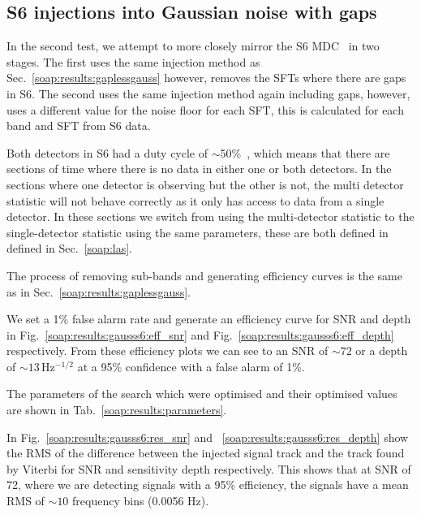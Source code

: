 \subsection{\label{soap:results:gausss6} S6 injections into Gaussian noise with gaps}

%
%
In the second test, we attempt to more closely mirror the S6 \gls{MDC}~\citep{walsh2016ComparisonMethods} in two stages. The first uses the same injection method as Sec.~\ref{soap:results:gaplessgauss} however, removes the \glspl{SFT} where there are gaps in S6. 
The second uses the same injection method again including gaps, however, uses a different value for the noise floor for each \gls{SFT}, this is calculated for each band and \gls{SFT} from S6 data.

Both detectors in S6 had a duty cycle of $\sim$50\%~\citep{aasi2015CharacterizationLIGO}, which means that there are sections of time where there is no data in either one or both detectors. In the sections where one detector is observing but the other is not, the multi detector statistic will not behave correctly as it only has access to data from a single detector.
In these sections we switch from using the multi-detector statistic to the single-detector statistic using the same parameters, these are both defined in defined in Sec.~\ref{soap:las}.

%
%
The process of removing sub-bands and generating efficiency curves is the same as in Sec.~\ref{soap:results:gaplessgauss}.


We set a 1\% false alarm rate and generate an efficiency curve for
\gls{SNR} and depth in Fig.~\ref{soap:results:gausss6:eff_snr} and
Fig.~\ref{soap:results:gausss6:eff_depth} respectively. From these efficiency plots we can
see to an \gls{SNR} of $\sim 72$ or a depth of $\sim 13$\,Hz$^{-1/2}$ at a 95\%
confidence with a false alarm of 1\%.

The parameters of the search which were optimised and their optimised values are shown in Tab.~\ref{soap:results:parameters}.


In Fig.~\ref{soap:results:gausss6:res_snr} and ~\ref{soap:results:gausss6:res_depth} show the \gls{RMS} of the difference between the injected signal track and the track found by Viterbi for \gls{SNR} and sensitivity depth respectively. This shows that at \gls{SNR} of 72, where we are detecting signals with a 95\% efficiency, the signals have a mean \gls{RMS} of $\sim 10$ frequency bins (0.0056 Hz).

